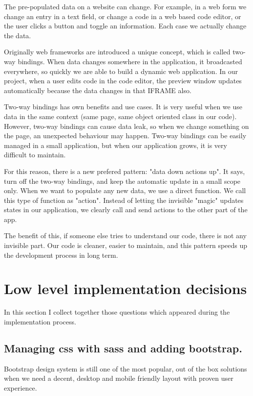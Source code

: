 \documentclass[11pt, a4paper, oneside, openright, medskipamount]{report}
\begin{document}
The pre-populated data on a website can change. For example, in a web form we change an entry in a text field, or change a code in a web based code editor, or the user clicks a button and toggle an information. Each case we actually change the data.

Originally web frameworks are introduced a unique concept, which is called two-way bindings. When data changes somewhere in the application, it broadcasted everywhere, so quickly we are able to build a dynamic web application. In our project, when a user edits code in the code editor, the preview window updates automatically because the data changes in that IFRAME also.

Two-way bindings has own benefits and use cases. It is very useful when we use data in the same context (same page, same object oriented class in our code). However, two-way bindings can cause data leak, so when we change something on the page, an unexpected behaviour may happen. Two-way bindings can be easily managed in a small application, but when our application grows, it is very difficult to maintain.

For this reason, there is a new prefered pattern: "data down actions up". It says, turn off the two-way bindings, and keep the automatic update in a small scope only. When we want to populate any new data, we use a direct function. We call this type of function as "action". Instead of letting the invisible "magic" updates states in our application, we clearly call and send actions to the other part of the app.

The benefit of this, if someone else tries to understand our code, there is not any invisible part. Our code is cleaner, easier to maintain, and this pattern speeds up the development process in long term.

\section{Low level implementation decisions}

In this section I collect together those questions which appeared during the implementation process.

\subsection{Managing css with sass and adding bootstrap.}

Bootstrap\cite{bootstrap} design system is still one of the most popular, out of the box solutions when we need a decent, desktop and mobile friendly layout with proven user experience.
\end{document}
